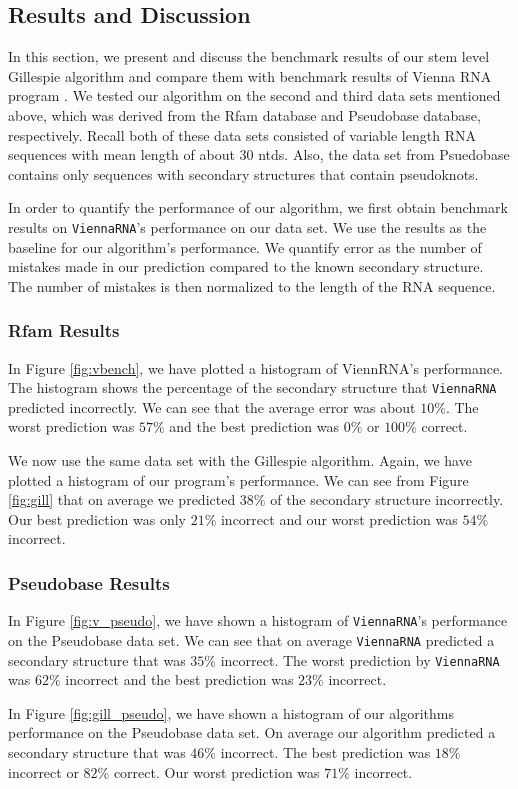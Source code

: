 \documentclass[11pt]{article}
\begin{document}
\begin{multicols}{2}
\subsection{Results and Discussion}

In this section, we present and discuss the benchmark results of our stem level Gillespie algorithm and compare them with benchmark results of Vienna RNA program \cite{Lorenz2011}. We tested our algorithm on the second and third data sets mentioned above, which was derived from the Rfam database and Pseudobase database, respectively. Recall both of these data sets consisted of variable length RNA sequences with mean length of about 30 ntds. Also, the data set from Psuedobase contains only sequences with secondary structures that contain pseudoknots.

In order to quantify the performance of our algorithm, we first obtain benchmark results on \texttt{ViennaRNA}'s performance on our data set. We use the results as the baseline for our algorithm's performance. We quantify error as the number of mistakes made in our prediction compared to the known secondary structure. The number of mistakes is then normalized to the length of the RNA sequence.

\subsubsection{Rfam Results}
In Figure \ref{fig:vbench}, we have plotted a histogram of ViennRNA's performance. The histogram shows the percentage of the secondary structure that \texttt{ViennaRNA} predicted incorrectly. We can see that the average error was about $10\%$. The worst prediction was $57\%$ and the best prediction was $0\%$ or $100\%$ correct.

We now use the same data set with the Gillespie algorithm. Again, we have plotted a histogram of our program's performance. We can see from Figure \ref{fig:gill} that on average we predicted $38\%$ of the secondary structure incorrectly. Our best prediction was only $21\%$ incorrect and our worst prediction was $54\%$ incorrect.

\subsubsection{Pseudobase Results}
In Figure \ref{fig:v_pseudo}, we have shown a histogram of \texttt{ViennaRNA}'s performance on the Pseudobase data set. We can see that on average \texttt{ViennaRNA} predicted a secondary structure that was $35\%$ incorrect. The worst prediction by \texttt{ViennaRNA} was $62\%$ incorrect and the best prediction was $23\%$ incorrect.

In Figure \ref{fig:gill_pseudo}, we have shown a histogram of our algorithms performance on the Pseudobase data set. On average our algorithm predicted a secondary structure that was $46\%$ incorrect. The best prediction was $18\%$ incorrect or $82\%$ correct. Our worst prediction was $71\%$ incorrect. 

\end{multicols}
\end{document}
